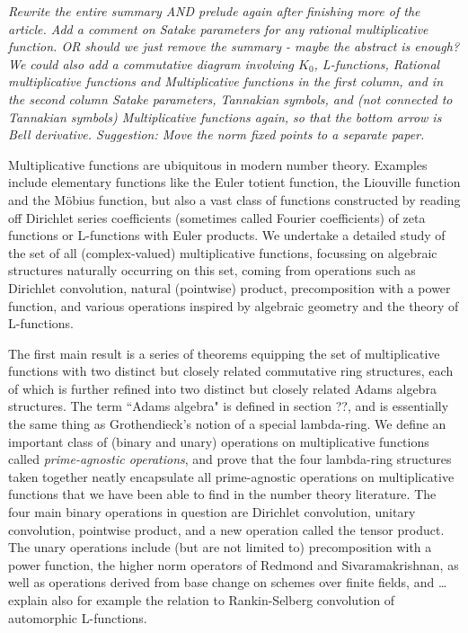 \emph{Rewrite the entire summary AND prelude again after finishing more of the article. Add a comment on Satake parameters for any rational multiplicative function. OR should we just remove the summary - maybe the abstract is enough? We could also add a commutative diagram involving $K_0$, L-functions, Rational multiplicative functions and Multiplicative functions in the first column, and in the second column Satake parameters, Tannakian symbols, and (not connected to Tannakian symbols) Multiplicative functions again, so that the bottom arrow is Bell derivative. Suggestion: Move the norm fixed points to a separate paper.}

Multiplicative functions are ubiquitous in modern number theory. Examples include elementary functions like the Euler totient function, the Liouville function and the M\"obius function, but also a vast class of functions constructed by reading off Dirichlet series coefficients (sometimes called Fourier coefficients) of zeta functions or L-functions with Euler products. We undertake a detailed study of the set of all (complex-valued) multiplicative functions, focussing on algebraic structures naturally occurring on this set, coming from operations such as Dirichlet convolution, natural (pointwise) product, precomposition with a power function, and various operations inspired by algebraic geometry and the theory of L-functions. 

The first main result is a series of theorems equipping the set of multiplicative functions with two distinct but closely related commutative ring structures, each of which is further refined into two distinct but closely related Adams algebra structures. The term ``Adams algebra" is defined in section ??, and is essentially the same thing as Grothendieck's notion of a special lambda-ring. We define an important class of (binary and unary) operations on multiplicative functions called \emph{prime-agnostic operations}, and prove that the four lambda-ring structures taken together neatly encapsulate all prime-agnostic operations on multiplicative functions that we have been able to find in the number theory literature. The four main binary operations in question are Dirichlet convolution, unitary convolution, pointwise product, and a new operation called the tensor product. The unary operations include (but are not limited to) precomposition with a power function, the higher norm operators of Redmond and Sivaramakrishnan, as well as operations derived from base change on schemes over finite fields, and \ldots explain also for example the relation to Rankin-Selberg convolution of automorphic L-functions.

